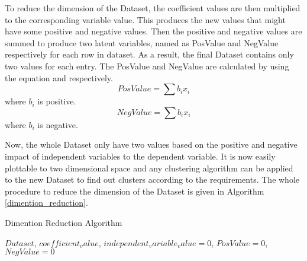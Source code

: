 \documentclass[12pt]{report}
\begin{document}
To reduce the dimension of the Dataset, the coefficient values are then multiplied to the corresponding variable value. This produces the new values that might have some positive and negative values. Then the positive and negative values are summed to produce two latent variables, named as PosValue and NegValue respectively for each row in dataset. As a result, the final Dataset contains only two values for each entry. The PosValue and NegValue are calculated by using the equation \cite{eq:PosValue} and \cite{eq:NegValue} respectively. 
\begin{equation}
\label{eq:PosValue}
 PosValue=\sum{b_{i}x_{i}}
\end{equation} 
where $b_{i}$ is positive.
\begin{equation}
\label{eq:NegValue}
NegValue=\sum{b_{i}x_{i}}
\end{equation}
where $b_{i}$ is negative.

Now, the whole Dataset only have two values based on the positive and negative impact of independent variables to the dependent variable. It is now easily plottable to two dimensional space and any clustering algorithm can be applied to the new Dataset to find out clusters according to the requirements. The whole procedure to reduce the dimension of the Dataset is given in Algorithm \ref{dimention_reduction}.


\begin{algorithm}
\caption{Dimention Reduction Algorithm}
\label{dimention_reduction}
\begin{algorithmic}[1]
\REQUIRE  $ Dataset$, $coefficient_value$, $independent_variable_value=0$, $PosValue=0$,$NegValue=0$ 
		
				
							\ELSE
									
							\ENDIF
				\ENDFOR
				
		\ENDFOR
		

\end{algorithmic}
\end{algorithm}
\end{document}
